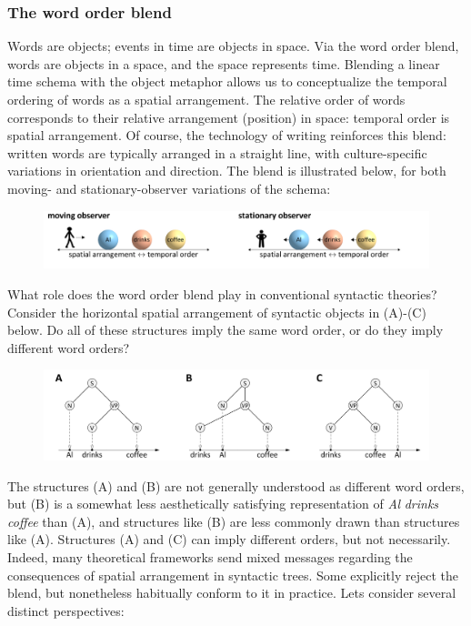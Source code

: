 \subsubsection{The word order blend}

Words are objects; events in time are objects in space. Via the word order blend, words are objects in a space, and the space represents time. Blending a linear time schema with the object metaphor allows us to conceptualize the temporal ordering of words as a spatial arrangement. The relative order of words corresponds to their relative arrangement (position) in space: temporal order is spatial arrangement. Of course, the technology of writing reinforces this blend: written words are typically arranged in a straight line, with culture-specific variations in orientation and direction. The blend is illustrated below, for both moving- and stationary-observer variations of the schema:

  
\begin{figure}
\includegraphics[width=\textwidth]{figures/Tilsen-img39.png}
\caption{\missingcaption}
\label{fig:}
\end{figure}
 

  What role does the word order blend play in conventional syntactic theories? Consider the horizontal spatial arrangement of syntactic objects in (A)-(C) below. Do all of these structures imply the same word order, or do they imply different word orders?

  
\begin{figure}
\includegraphics[width=\textwidth]{figures/Tilsen-img40.png}
\caption{\missingcaption}
\label{fig:}
\end{figure}
 

  The structures (A) and (B) are not generally understood as different word orders, but (B) is a somewhat less aesthetically satisfying representation of \textit{Al} \textit{drinks} \textit{coffee} than (A), and structures like (B) are less commonly drawn than structures like (A). Structures (A) and (C) can imply different orders, but not necessarily. Indeed, many theoretical frameworks send mixed messages regarding the consequences of spatial arrangement in syntactic trees. Some explicitly reject the blend, but nonetheless habitually conform to it in practice. Lets consider several distinct perspectives:

